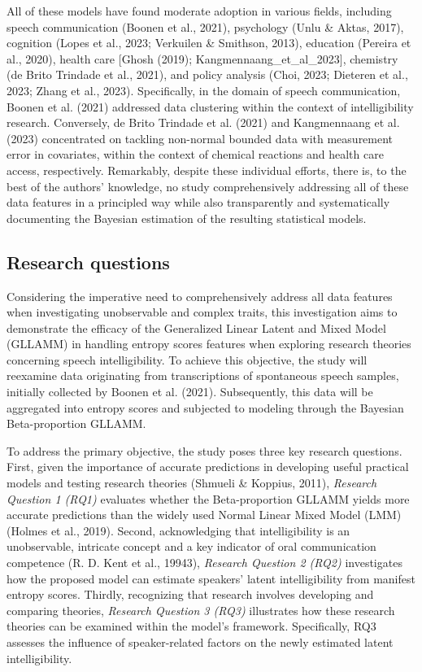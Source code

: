 \documentclass[
]{agujournal2019}
\begin{document}
All of these models have found moderate adoption in various fields,
including speech communication (Boonen et al., 2021), psychology (Unlu
\& Aktas, 2017), cognition (Lopes et al., 2023; Verkuilen \& Smithson,
2013), education (Pereira et al., 2020), health care {[}Ghosh (2019);
Kangmennaang\_et\_al\_2023{]}, chemistry (de Brito Trindade et al.,
2021), and policy analysis (Choi, 2023; Dieteren et al., 2023; Zhang et
al., 2023). Specifically, in the domain of speech communication, Boonen
et al. (2021) addressed data clustering within the context of
intelligibility research. Conversely, de Brito Trindade et al. (2021)
and Kangmennaang et al. (2023) concentrated on tackling non-normal
bounded data with measurement error in covariates, within the context of
chemical reactions and health care access, respectively. Remarkably,
despite these individual efforts, there is, to the best of the authors'
knowledge, no study comprehensively addressing all of these data
features in a principled way while also transparently and systematically
documenting the Bayesian estimation of the resulting statistical models.

\subsection{Research questions}\label{sec-I-RQ}

Considering the imperative need to comprehensively address all data
features when investigating unobservable and complex traits, this
investigation aims to demonstrate the efficacy of the Generalized Linear
Latent and Mixed Model (GLLAMM) in handling entropy scores features when
exploring research theories concerning speech intelligibility. To
achieve this objective, the study will reexamine data originating from
transcriptions of spontaneous speech samples, initially collected by
Boonen et al. (2021). Subsequently, this data will be aggregated into
entropy scores and subjected to modeling through the Bayesian
Beta-proportion GLLAMM.

To address the primary objective, the study poses three key research
questions. First, given the importance of accurate predictions in
developing useful practical models and testing research theories
(Shmueli \& Koppius, 2011), \emph{Research Question 1 (RQ1)} evaluates
whether the Beta-proportion GLLAMM yields more accurate predictions than
the widely used Normal Linear Mixed Model (LMM) (Holmes et al., 2019).
Second, acknowledging that intelligibility is an unobservable, intricate
concept and a key indicator of oral communication competence (R. D. Kent
et al., 19943), \emph{Research Question 2 (RQ2)} investigates how the
proposed model can estimate speakers' latent intelligibility from
manifest entropy scores. Thirdly, recognizing that research involves
developing and comparing theories, \emph{Research Question 3 (RQ3)}
illustrates how these research theories can be examined within the
model's framework. Specifically, RQ3 assesses the influence of
speaker-related factors on the newly estimated latent intelligibility.
\end{document}
